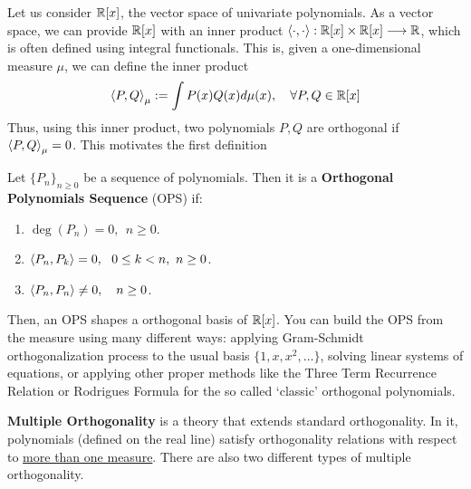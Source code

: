 \documentclass[portrait,final,a0paper,fontscale=0.38]{baposter}
\begin{document}
\begin{poster}
{\begin{multicols}{2}
  Let us consider $\mathbb{R}[x]$, the vector space of univariate polynomials. As a vector space, we can provide $\mathbb{R}[x]$ with an inner product $\left\langle \cdot , \cdot \right\rangle:\mathbb{R}[x]\times\mathbb{R}[x]\longrightarrow\mathbb{R}$, which is often defined using integral functionals. This is, given a one-dimensional measure $\mu$, we can define the inner product
  \begin{equation}
    \label{eq:prodesc}
    \left\langle P , Q \right\rangle_\mu:=\int P(x)Q(x)d\mu(x), \ \ \ \forall P,Q\in\mathbb{R}[x]
  \end{equation}
  Thus, using this inner product, two polynomials $P,Q$ are orthogonal if $\left\langle P , Q \right\rangle_\mu = 0$. This motivates the first definition
  \begin{definition}
    Let $\{P_n\}_{n\geq 0}$ be a sequence of polynomials. Then it is a \textbf{Orthogonal Polynomials Sequence} (OPS) if:
    \begin{enumerate}
      \item $\deg(P_n)=0, \ \ n\geq 0$.
      \item $\left\langle P_n , P_k \right\rangle=0, \ \ 0\leq k < n, \ n\geq 0$.
      \item $\prodesc{P_n}{P_n} \not = 0, \ \ \ n\geq 0$.
    \end{enumerate}
  \end{definition}
  Then, an OPS shapes a orthogonal basis of $\mathbb{R}[x]$. You can build the OPS from the measure using many different ways: applying Gram-Schmidt orthogonalization process to the usual basis $\{1,x,x^2,\dots\}$, solving linear systems of equations, or applying other proper methods like the Three Term Recurrence Relation or Rodrigues Formula for the so called `classic' orthogonal polynomials. 


\end{multicols}
	}


  {

\begin{multicols}{2}

  \textbf{Multiple Orthogonality} is a theory that extends standard orthogonality. In it, polynomials (defined on the real line) satisfy orthogonality relations with respect to \underline{more than one measure}. There are also two different types of multiple orthogonality.


\end{multicols}}
\end{poster}
\end{document}
